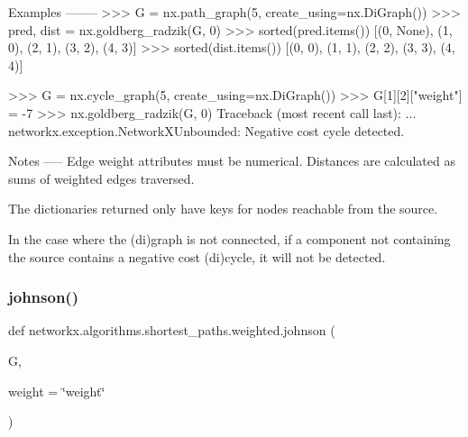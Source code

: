 \begin{DoxyVerb}
Examples
--------
>>> G = nx.path_graph(5, create_using=nx.DiGraph())
>>> pred, dist = nx.goldberg_radzik(G, 0)
>>> sorted(pred.items())
[(0, None), (1, 0), (2, 1), (3, 2), (4, 3)]
>>> sorted(dist.items())
[(0, 0), (1, 1), (2, 2), (3, 3), (4, 4)]

>>> G = nx.cycle_graph(5, create_using=nx.DiGraph())
>>> G[1][2]["weight"] = -7
>>> nx.goldberg_radzik(G, 0)
Traceback (most recent call last):
    ...
networkx.exception.NetworkXUnbounded: Negative cost cycle detected.

Notes
-----
Edge weight attributes must be numerical.
Distances are calculated as sums of weighted edges traversed.

The dictionaries returned only have keys for nodes reachable from
the source.

In the case where the (di)graph is not connected, if a component
not containing the source contains a negative cost (di)cycle, it
will not be detected.\end{DoxyVerb}
 \mbox{\label{namespacenetworkx_1_1algorithms_1_1shortest__paths_1_1weighted_a8b33735d56c0db02c1126dd8eed79650}} 
\subsubsection{\texorpdfstring{johnson()}{johnson()}}
{\footnotesize\ttfamily def networkx.\+algorithms.\+shortest\+\_\+paths.\+weighted.\+johnson (\begin{DoxyParamCaption}\item[{}]{G,  }\item[{}]{weight = {\ttfamily \char`\"{}weight\char`\"{}} }\end{DoxyParamCaption})}

